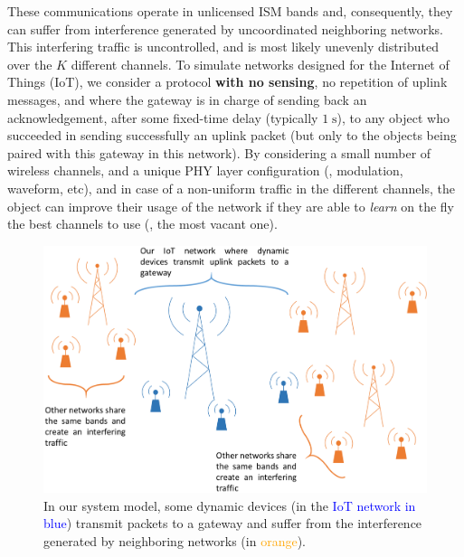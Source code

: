 These communications operate in unlicensed ISM bands and, consequently, they can suffer from interference generated by uncoordinated neighboring networks. This interfering traffic is uncontrolled, and is most likely unevenly distributed over the $K$ different channels.
%
To simulate networks designed for the Internet of Things (IoT), we consider a protocol \textbf{with no sensing}, no repetition of uplink messages, and where the gateway is in charge of sending back an acknowledgement, after some fixed-time delay (typically $1\;\mathrm{s}$), to any object who succeeded in sending successfully an uplink packet (but only to the objects being paired with this gateway in this network).
%
By considering a small number of wireless channels, and a unique PHY layer configuration (\ie, modulation, waveform, etc), and in case of a non-uniform traffic in the different channels,
the object can improve their usage of the network if they are able to \emph{learn} on the fly the best channels to use (\ie, the most vacant one).

\begin{figure}[!t]
    \centering
    \includegraphics[width=0.70\linewidth]{system_model1.eps}
    \caption{In our system model, some dynamic devices (in the \textcolor{blue}{IoT network in blue}) transmit packets to a gateway and suffer from the interference generated by neighboring networks (in \textcolor{orange}{orange}).}
    \label{fig:41:system_model1}
\end{figure}


